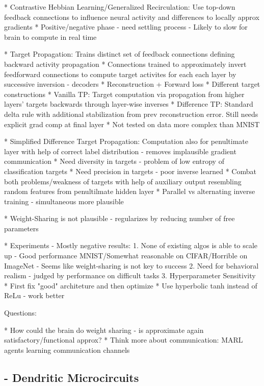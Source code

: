 \documentclass{article}
\theoremstyle{definition}
\begin{document}
* Contrastive Hebbian Learning/Generalized Recirculation: Use top-down feedback connections to influence neural activity and differences to locally approx gradients
    * Positive/negative phase - need settling process - Likely to slow for brain to compute in real time

* Target Propagation: Trains distinct set of feedback connections defining backward activity propagation
    * Connections trained to approximately invert feedforward connections to compute target activites for each each layer by successive inversion - decoders
        * Reconstruction + Forward loss
        * Different target constructions
    * Vanilla TP: Target computation via propagation from higher layers' targets backwards through layer-wise inverses
    * Difference TP: Standard delta rule with additional stabilization from prev reconstruction error. Still needs explicit grad comp at final layer
    * Not tested on data more complex than MNIST

* Simplified Difference Target Propagation: Computation also for penultimate layer with help of correct label distribution - removes implausible gradient communication
    * Need diversity in targets - problem of low entropy of classification targets
    * Need precision in targets - poor inverse learned
    * Combat both problems/weakness of targets with help of auxiliary output resembling random features from penultilmate hidden layer
    * Parallel vs alternating inverse training - simultaneous more plausible

* Weight-Sharing is not plausible - regularizes by reducing number of free parameters

* Experiments - Mostly negative results:
    1. None of existing algos is able to scale up - Good performance MNIST/Somewhat reasonable on CIFAR/Horrible on ImageNet - Seems like weight-sharing is not key to success
    2. Need for behavioral realism - judged by performance on difficult tasks
    3. Hyperparameter Sensitivity
        * First fix "good" architeture and then optimize
        * Use hyperbolic tanh instead of ReLu - work better


Questions:

* How could the brain do weight sharing - is approximate again satisfactory/functional approx?
* Think more about communication: MARL agents learning communication channels


\subsection*{\citet{sacramento2018} - Dendritic Microcircuits}
\end{document}

